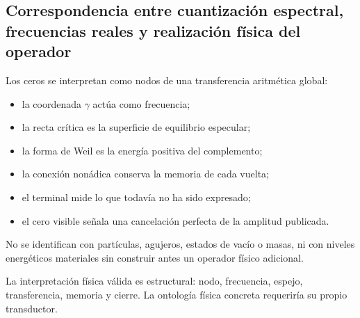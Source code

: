 \subsection{Correspondencia entre cuantización espectral, frecuencias reales y realización física del operador}
Los ceros se interpretan como nodos de una transferencia aritmética global:\par
\begin{itemize}
\item la coordenada \(\gamma\) actúa como frecuencia;
\item la recta crítica es la superficie de equilibrio especular;
\item la forma de Weil es la energía positiva del complemento;
\item la conexión nonádica conserva la memoria de cada vuelta;
\item el terminal mide lo que todavía no ha sido expresado;
\item el cero visible señala una cancelación perfecta de la amplitud publicada.
\end{itemize}
No se identifican con partículas, agujeros, estados de vacío o masas, ni con niveles energéticos materiales sin construir antes un operador físico adicional.\par
La interpretación física válida es estructural: nodo, frecuencia, espejo, transferencia, memoria y cierre. La ontología física concreta requeriría su propio transductor.\par
{}
